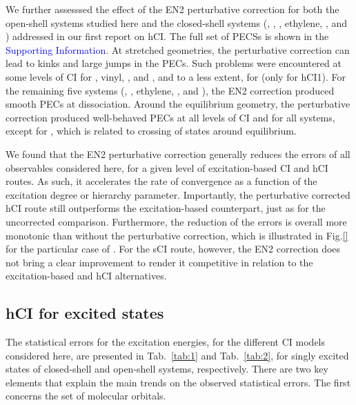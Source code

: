\documentclass[aip,jcp,reprint,noshowkeys,superscriptaddress]{revtex4-1}
\newcommand{\SupInf}{\textcolor{blue}{Supporting Information}}
\begin{document}
We further assesssed the effect of the EN2 perturbative correction for both the open-shell systems studied here 
and the closed-shell systems (, , , ethylene, , and ) addressed in our first report on hCI. \cite{Kossoski_2022}
The full set of PECSs is shown in the {\SupInf}.
At stretched geometries, the perturbative correction can lead to kinks and large jumps in the PECs.
Such problems were encountered at some levels of CI for , vinyl, , and , and to a less extent, for  (only for hCI1).
For the remaining five systems (, , ethylene, , and ),
the EN2 correction produced smooth PECs at dissociation.
Around the equilibrium geometry, the perturbative correction produced well-behaved PECs at all levels of CI and for all systems, 
except for , which is related to crossing of states around equilibrium.

We found that the EN2 perturbative correction generally reduces the errors of all observables considered here, for a given level of excitation-based CI and hCI routes.
As such, it accelerates the rate of convergence as a function of the excitation degree or hierarchy parameter.
Importantly, the perturbative corrected hCI route still outperforms the excitation-based counterpart, just as for the uncorrected comparison.
Furthermore, the reduction of the errors is overall more monotonic than without the perturbative correction,
which is illustrated in Fig.\ref{} for the particular case of .
For the sCI route, however, the EN2 correction does not bring a clear improvement to render it competitive in relation to the excitation-based and hCI alternatives.



 


\subsection{hCI for excited states}
\label{sec:res_B}

The statistical errors for the excitation energies, for the different CI models considered here,
are presented in Tab.~\ref{tab:1} and Tab.~\ref{tab:2},
for singly excited states of closed-shell and open-shell systems, respectively.
There are two key elements that explain the main trends on the observed statistical errors.
The first concerns the set of molecular orbitals.
\end{document}
